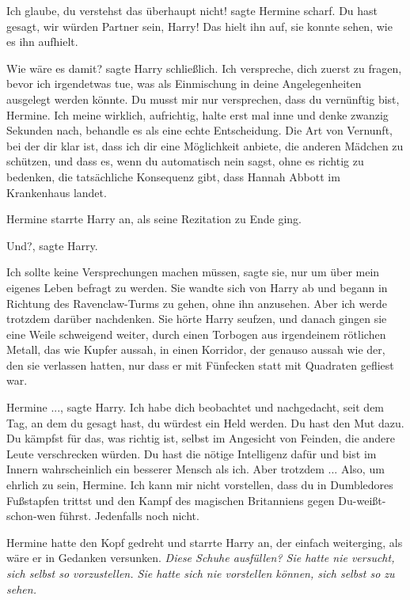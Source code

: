 \glqq{}Ich glaube, du verstehst das überhaupt nicht!\grqq{} sagte Hermine scharf.
\glqq{}Du hast gesagt, wir würden Partner sein, Harry!\grqq{} Das hielt ihn auf,
sie konnte sehen, wie es ihn aufhielt.

\glqq{}Wie wäre es damit?\grqq{} sagte Harry schließlich. \glqq{}Ich verspreche,
dich zuerst zu fragen, bevor ich irgendetwas tue, was als Einmischung in deine
Angelegenheiten ausgelegt werden könnte. Du musst mir nur versprechen, dass du
vernünftig bist, Hermine. Ich meine wirklich, aufrichtig, halte erst mal inne
und denke zwanzig Sekunden nach, behandle es als eine echte Entscheidung. Die
Art von Vernunft, bei der dir klar ist, dass ich dir eine Möglichkeit anbiete,
die anderen Mädchen zu schützen, und dass es, wenn du automatisch nein sagst,
ohne es richtig zu bedenken, die tatsächliche Konsequenz gibt, dass Hannah
Abbott im Krankenhaus landet.\grqq{}

Hermine starrte Harry an, als seine Rezitation zu Ende ging.

\glqq{}Und?\grqq{}, sagte Harry.

\glqq{}Ich sollte keine Versprechungen machen müssen\grqq{}, sagte sie, \glqq{}nur
um über mein eigenes Leben befragt zu werden.\grqq{} Sie wandte sich von Harry
ab und begann in Richtung des Ravenclaw-Turms zu gehen, ohne ihn anzusehen.
\glqq{}Aber ich werde trotzdem darüber nachdenken.\grqq{} Sie hörte Harry
seufzen, und danach gingen sie eine Weile schweigend weiter, durch einen
Torbogen aus irgendeinem rötlichen Metall, das wie Kupfer aussah, in einen
Korridor, der genauso aussah wie der, den sie verlassen hatten, nur dass er mit
Fünfecken statt mit Quadraten gefliest war.

\glqq{}Hermine ...\grqq{}, sagte Harry. \glqq{}Ich habe dich beobachtet und
nachgedacht, seit dem Tag, an dem du gesagt hast, du würdest ein Held werden. Du
hast den Mut dazu. Du kämpfst für das, was richtig ist, selbst im Angesicht von
Feinden, die andere Leute verschrecken würden. Du hast die nötige Intelligenz
dafür und bist im Innern wahrscheinlich ein besserer Mensch als ich. Aber
trotzdem ... Also, um ehrlich zu sein, Hermine. Ich kann mir nicht vorstellen,
dass du in Dumbledores Fußstapfen trittst und den Kampf des magischen
Britanniens gegen Du-weißt-schon-wen führst. Jedenfalls noch nicht.\grqq{}

Hermine hatte den Kopf gedreht und starrte Harry an, der einfach weiterging, als
wäre er in Gedanken versunken. \emph{Diese Schuhe ausfüllen? Sie hatte nie
versucht, sich selbst so vorzustellen. Sie hatte sich nie vorstellen können,
sich selbst so zu sehen.}

